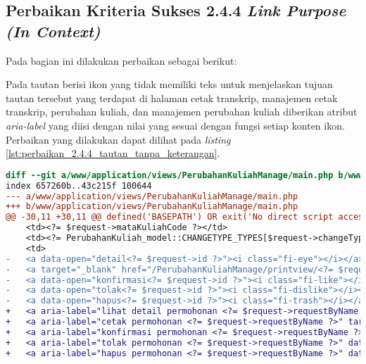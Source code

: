 \subsection{Perbaikan Kriteria Sukses 2.4.4 \textit{Link Purpose (In Context)}}
\label{subsec:perbaikan_kriteria_sukses_2.4.4}
Pada bagian ini dilakukan perbaikan sebagai berikut:

Pada tautan berisi ikon yang tidak memiliki teks untuk menjelaskan tujuan tautan tersebut yang terdapat di halaman cetak transkrip, manajemen cetak transkrip, perubahan kuliah, dan manajemen perubahan kuliah diberikan atribut \textit{aria-label} yang diisi dengan nilai yang sesuai dengan fungsi setiap konten ikon. Perbaikan yang dilakukan dapat dilihat pada \textit{listing} \ref{lst:perbaikan_2.4.4_tautan_tanpa_keterangan}.
\begin{lstlisting}[frame=single, label={lst:perbaikan_2.4.4_tautan_tanpa_keterangan}, language=diff, caption=Perbaikan Kriteria Sukses 2.4.4 - Tautan Tanpa Keterangan]
diff --git a/www/application/views/PerubahanKuliahManage/main.php b/www/application/views/PerubahanKuliahManage/main.php
index 657260b..43c215f 100644
--- a/www/application/views/PerubahanKuliahManage/main.php
+++ b/www/application/views/PerubahanKuliahManage/main.php
@@ -30,11 +30,11 @@ defined('BASEPATH') OR exit('No direct script access allowed');
    <td><?= $request->mataKuliahCode ?></td>
    <td><?= PerubahanKuliah_model::CHANGETYPE_TYPES[$request->changeType] ?></td>
    <td>
-   <a data-open="detail<?= $request->id ?>"><i class="fi-eye"></i></a>
-   <a target="_blank" href="/PerubahanKuliahManage/printview/<?= $request->id ?>"><i class="fi-print"></i></a>
-   <a data-open="konfirmasi<?= $request->id ?>"><i class="fi-like"></i></a>                                    
-   <a data-open="tolak<?= $request->id ?>"><i class="fi-dislike"></i></a>
-   <a data-open="hapus<?= $request->id ?>"><i class="fi-trash"></i></a>
+   <a aria-label="lihat detail permohonan <?= $request->requestByName ?>" data-open="detail<?= $request->id ?>"><i class="fi-eye"></i></a>
+   <a aria-label="cetak permohonan <?= $request->requestByName ?>" target="_blank" href="/PerubahanKuliahManage/printview/<?= $request->id ?>"><i class="fi-print"></i></a>
+   <a aria-label="konfirmasi permohonan <?= $request->requestByName ?>" data-open="konfirmasi<?= $request->id ?>"><i class="fi-like"></i></a>
+   <a aria-label="tolak permohonan <?= $request->requestByName ?>" data-open="tolak<?= $request->id ?>"><i class="fi-dislike"></i></a>
+   <a aria-label="hapus permohonan <?= $request->requestByName ?>" data-open="hapus<?= $request->id ?>"><i class="fi-trash"></i></a>

\end{lstlisting}
